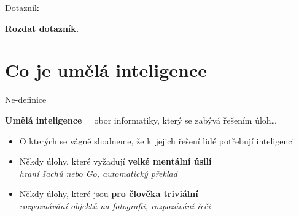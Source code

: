 \documentclass[aspectratio=169,dvipsnames]{beamer}
\begin{document}
\begin{frame}{Dotazník}

    \begin{center}
        \bf\Huge Rozdat dotazník.
    \end{center}
\end{frame}


\section[Co je AI]{Co je umělá inteligence}


\begin{frame}{Ne-definice}

    \begin{center}
        \Large
    \textbf{Umělá inteligence} = obor informatiky, který se zabývá řešením
    úloh\ldots
    \end{center}

    \vspace{10pt}

    \begin{itemize}

        \item<2-> O kterých se vágně shodneme, že k~jejich řešení lidé potřebují
            inteligenci

        \item<3-> Někdy úlohy, které vyžadují \textbf{velké mentální úsilí} \\
            \quad \emph{hraní šachů nebo Go, automatický překlad}

        \item<4-> Někdy úlohy, které jsou \textbf{pro člověka triviální} \\
            \quad \emph{rozpoznávání objektů na fotografii, rozpozávání řeči}

    \end{itemize}

    \centering\vspace{15pt}


\end{frame}

\end{document}
